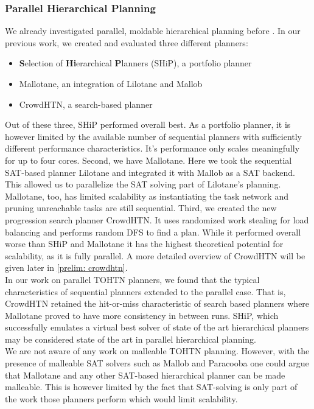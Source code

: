 \subsubsection{Parallel Hierarchical Planning}
We already investigated parallel, moldable hierarchical planning before \cite{bretl2021parallel}. In our previous work, we created and evaluated three different planners:
\begin{itemize}
	\item \textbf{S}election of \textbf{Hi}erarchical \textbf{P}lanners (SHiP), a portfolio planner
	\item Mallotane, an integration of Lilotane and Mallob
	\item CrowdHTN, a search-based planner
\end{itemize}
Out of these three, SHiP performed overall best. As a portfolio planner, it is however limited by the available number of sequential planners with sufficiently different performance characteristics. It's performance only scales meaningfully for up to four cores. Second, we have Mallotane. Here we took the sequential SAT-based planner Lilotane and integrated it with Mallob as a SAT backend. This allowed us to parallelize the SAT solving part of Lilotane's planning. Mallotane, too, has limited scalability as instantiating the task network and pruning unreachable tasks are still sequential. Third, we created the new progression search planner CrowdHTN. It uses randomized work stealing for load balancing and performs random DFS to find a plan. While it performed overall worse than SHiP and Mallotane it has the highest theoretical potential for scalability, as it is fully parallel. A more detailed overview of CrowdHTN will be given later in \ref{prelim: crowdhtn}. \\
In our work on parallel TOHTN planners, we found that the typical characteristics of sequential planners extended to the parallel case. That is, CrowdHTN retained the hit-or-miss characteristic of search based planners where Mallotane proved to have more consistency in between runs. SHiP, which successfully emulates a virtual best solver of state of the art hierarchical planners may be considered state of the art in parallel hierarchical planning. \\
We are not aware of any work on malleable TOHTN planning. However, with the presence of malleable SAT solvers such as Mallob \cite{sanders2022decentralized} and Paracooba \cite{heisinger2020distributed} one could argue that Mallotane and any other SAT-based hierarchical planner can be made malleable. This is however limited by the fact that SAT-solving is only part of the work those planners perform which would limit scalability.